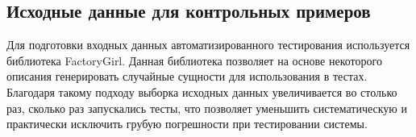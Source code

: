 \subsection{Исходные данные для контрольных примеров}

Для подготовки входных данных автоматизированного тестирования используется библиотека FactoryGirl. Данная библиотека позволяет на основе некоторого описания генерировать случайные сущности для использования в тестах. Благодаря такому подходу выборка исходных данных увеличивается во столько раз, сколько раз запускались тесты, что позволяет уменьшить систематическую и практически исключить грубую погрешности при тестировании системы.
